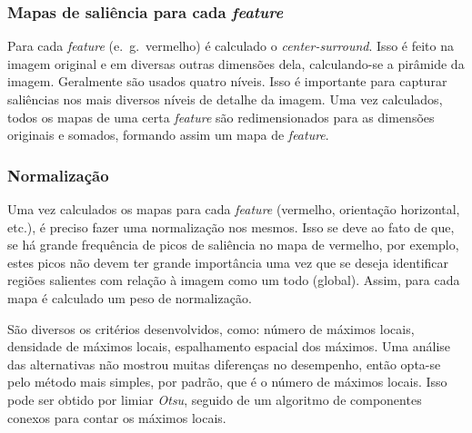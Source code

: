 \documentclass[11pt]{article}
\newcommand{\tit}[1]{\textit{#1}}
\newcommand{\eg}{e.~g.~}
\begin{document}
\subsubsection{Mapas de saliência para cada \tit{feature}}
Para cada \tit{feature} (\eg vermelho) é calculado o \tit{center-surround}.
Isso é feito na imagem original e em diversas outras dimensões dela,
calculando-se a pirâmide da imagem. Geralmente são usados quatro níveis.
Isso é importante para capturar saliências nos mais diversos níveis de detalhe
da imagem. Uma vez calculados, todos os mapas de uma certa \tit{feature}
são redimensionados para as dimensões originais e somados, formando assim
um mapa de \tit{feature}.

\subsubsection{Normalização}
Uma vez calculados os mapas para cada \tit{feature} (vermelho,
orientação horizontal, etc.), é preciso fazer uma normalização nos mesmos.
Isso se deve ao fato de que, se há grande frequência de picos de saliência
no mapa de vermelho, por exemplo, estes picos não devem ter grande importância uma vez que se
deseja identificar regiões salientes com relação à imagem como um todo (global).
Assim, para cada mapa é calculado um peso de normalização.

São diversos os critérios desenvolvidos, como: número de máximos locais,
densidade de máximos locais, espalhamento espacial dos máximos.
Uma análise das alternativas não mostrou muitas diferenças no desempenho,
então opta-se pelo método mais simples, por padrão, que é o número de máximos
locais. Isso pode ser obtido por limiar \tit{Otsu}, seguido de um algoritmo
de componentes conexos para contar os máximos locais.
\end{document}
